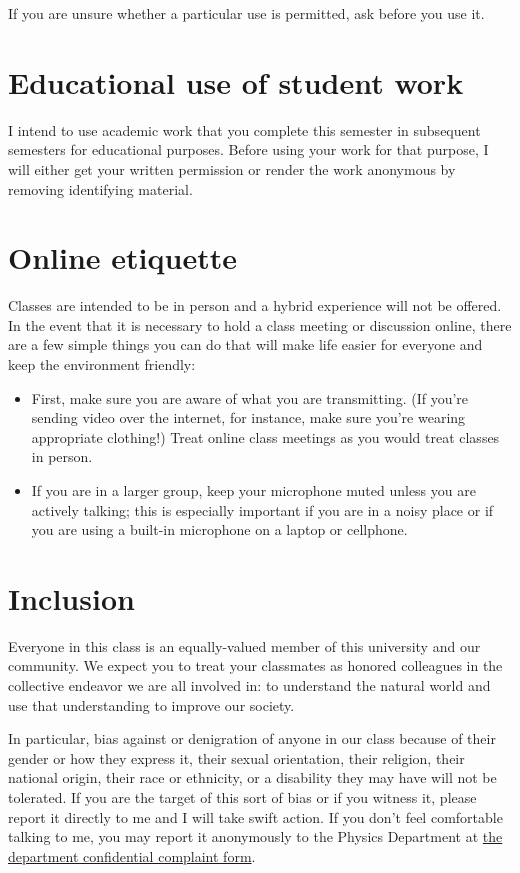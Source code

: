 \documentclass[12pt]{article}
\begin{document}
If you are unsure whether a particular use is permitted, ask before you use it.

\section*{Educational use of student work}

I intend to use academic work that you complete this semester in subsequent semesters for educational purposes. Before using your work for that purpose, I will either get your written permission or render the work anonymous by removing identifying material.

\section*{Online etiquette}

Classes are intended to be in person and a hybrid experience will not be offered. In the event that it is necessary
to hold a class meeting or discussion online, there are a few simple things you can do that will make life easier for everyone and keep the environment friendly:
\begin{itemize}
\item First, make sure you are aware of what you are transmitting. (If you’re sending video over the internet, for instance, make sure you’re wearing appropriate clothing!) Treat online class meetings as you would treat classes in person.
\item If you are in a larger group, keep your microphone muted unless you are actively talking; this is especially important if you are in a noisy place or if you are using a built-in microphone on a laptop or cellphone.
\end{itemize}

\section*{Inclusion}

Everyone in this class is an equally-valued member of this university and our community. We expect you to treat your classmates as honored colleagues in the collective endeavor we are all involved in: to understand the natural world and use that understanding to improve our society.

In particular, bias against or denigration of anyone in our class because of their gender or how they express it, their sexual orientation, their religion, their national origin, their race or ethnicity, or a disability they may have will not be tolerated. If you are the target of this sort of bias or if you witness it, please report it directly to me and I will take swift action. If you don’t feel comfortable talking to me, you may report it anonymously to the Physics Department at
\href{https://syracuseuniversity.qualtrics.com/jfe/form/SV_9pORpTKnq6pLeyF}{the department confidential complaint form}.
\end{document}
